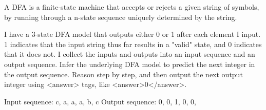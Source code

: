 A DFA is a finite-state machine that accepts or rejects a given string of symbols, by running through a n-state sequence uniquely determined by the string.

I have a 3-state DFA model that outputs either 0 or 1 after each element I input. 1 indicates that the input string thus far results in a "valid" state, and 0 indicates that it does not. I collect the inputs and outputs into an input sequence and an output sequence. Infer the underlying DFA model to predict the next integer in the output sequence. Reason step by step, and then output the next output integer using <answer> tags, like <answer>0</answer>.

Input sequence: c, a, a, a, b, c
Output sequence: 0, 0, 1, 0, 0, 
